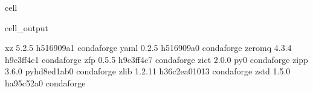 \documentclass[letterpaper,table,10pt,english]{jupyterBook}
\begin{document}
\begin{sphinxuseclass}{cell}
\begin{sphinxVerbatimOutput}
\begin{sphinxuseclass}{cell_output}
\begin{sphinxVerbatim}[commandchars=\\\{\}]
xz                        5.2.5                h516909a\PYGZus{}1    conda\PYGZhy{}forge
yaml                      0.2.5                h516909a\PYGZus{}0    conda\PYGZhy{}forge
zeromq                    4.3.4                h9c3ff4c\PYGZus{}1    conda\PYGZhy{}forge
zfp                       0.5.5                h9c3ff4c\PYGZus{}7    conda\PYGZhy{}forge
zict                      2.0.0                      py\PYGZus{}0    conda\PYGZhy{}forge
zipp                      3.6.0              pyhd8ed1ab\PYGZus{}0    conda\PYGZhy{}forge
zlib                      1.2.11            h36c2ea0\PYGZus{}1013    conda\PYGZhy{}forge
zstd                      1.5.0                ha95c52a\PYGZus{}0    conda\PYGZhy{}forge
\end{sphinxVerbatim}

\end{sphinxuseclass}\end{sphinxVerbatimOutput}

\end{sphinxuseclass}
\end{document}
